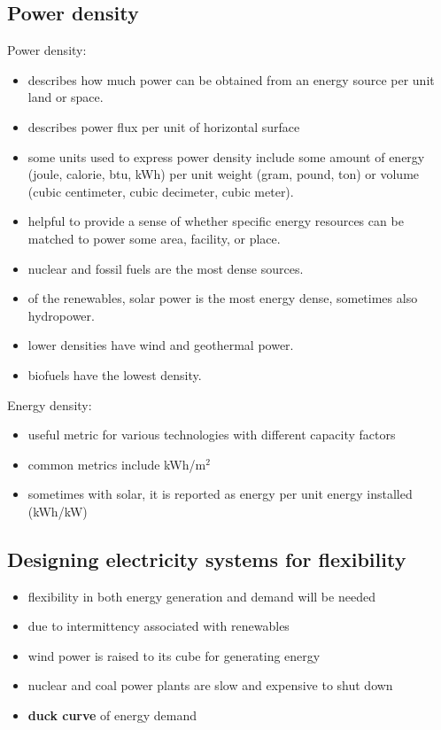 \subsection{Power density}
Power density:
\begin{itemize}
	\item describes how much power can be obtained from an energy source
	per unit land or space.
	\item describes power flux per unit of horizontal surface
	\item some units used to express power density include some amount of
	energy (joule, calorie, btu, kWh) per unit weight (gram, pound, ton)
	or volume (cubic centimeter, cubic decimeter, cubic meter).
	\item helpful to provide a sense of whether specific energy resources
	can be matched to power some area, facility, or place.
	\item nuclear and fossil fuels are the most dense sources.
	\item of the renewables, solar power is the most energy dense,
	sometimes also hydropower.
	\item lower densities have wind and geothermal power.
	\item biofuels have the lowest density.
\end{itemize}

Energy density:
\begin{itemize}
	\item useful metric for various technologies with different capacity
	factors
	\item common metrics include kWh/m$^2$
	\item sometimes with solar, it is reported as energy per unit energy
	installed (kWh/kW)
\end{itemize}

\subsection{Designing electricity systems for flexibility}
\begin{itemize}
	\item flexibility in both energy generation and demand will be needed
	\item due to intermittency associated with renewables
	\item wind power is raised to its cube for generating energy
	\item nuclear and coal power plants are slow and expensive to shut
	down
	\item \textbf{duck curve} of energy demand
\end{itemize}

